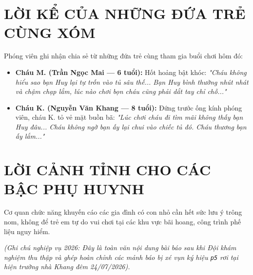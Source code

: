 \documentclass[12pt,a4paper]{article}
\begin{document}
\section*{LỜI KỂ CỦA NHỮNG ĐỨA TRẺ CÙNG XÓM}
Phóng viên ghi nhận chia sẻ từ những đứa trẻ cùng tham gia buổi chơi hôm đó:
\begin{itemize}[leftmargin=1.5cm]
    \item \textbf{Cháu M. (Trần Ngọc Mai — 6 tuổi):} Hốt hoảng bật khóc: \textit{"Cháu không hiểu sao bạn Huy lại tự trốn vào tủ sâu thế... Bạn Huy bình thường nhút nhát và chậm chạp lắm, lúc nào chơi bọn cháu cũng phải dắt tay chỉ chỗ..."}
    \item \textbf{Cháu K. (Nguyễn Văn Khang — 8 tuổi):} Đứng trước ống kính phóng viên, cháu K. tỏ vẻ mặt buồn bã: \textit{"Lúc chơi cháu đi tìm mãi không thấy bạn Huy đâu... Cháu không ngờ bạn ấy lại chui vào chiếc tủ đó. Cháu thương bạn ấy lắm..."}
\end{itemize}

\section*{LỜI CẢNH TỈNH CHO CÁC BẬC PHỤ HUYNH}
Cơ quan chức năng khuyến cáo các gia đình có con nhỏ cần hết sức lưu ý trông nom, không để trẻ em tự do vui chơi tại các khu vực bãi hoang, công trình phế liệu nguy hiểm.

\vspace{0.6cm}
\noindent \textit{(Ghi chú nghiệp vụ 2026: Đây là toàn văn nội dung bài báo sau khi Đội khám nghiệm thu thập và ghép hoàn chỉnh các mảnh báo bị xé vụn ký hiệu \texttt{p5} rơi tại hiện trường nhà Khang đêm 24/07/2026).}
\end{document}
